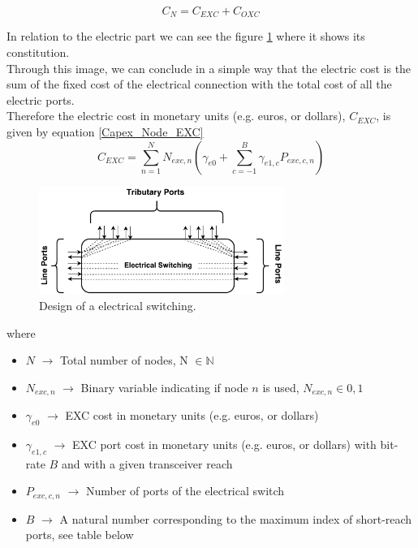 \begin{equation}
C_N = C_{EXC} + C_{OXC}
\label{Capex_Node}
\end{equation}

\vspace{11pt}
In relation to the electric part we can see the figure \ref{exc_design} where it shows its constitution.\\
Through this image, we can conclude in a simple way that the electric cost is the sum of the fixed cost of the electrical connection with the total cost of all the electric ports.\\
Therefore the electric cost in monetary units (e.g. euros, or dollars), $C_{EXC}$, is given by equation \ref{Capex_Node_EXC}\\

\begin{equation}
C_{EXC} = \sum_{n=1}^{N} N_{exc,n} \left( \gamma_{e0} + \sum_{c=-1}^B \gamma_{e1,c} P_{exc,c,n} \right)
\label{Capex_Node_EXC}
\end{equation}

\begin{figure}[h!]
\centering
\includegraphics[width=8cm]{sdf/ILP/figures/exc_design}
\caption{Design of a electrical switching.}
\label{exc_design}
\end{figure}

\noindent
where
\begin{itemize}
\item{$N$				$\rightarrow$	Total number of nodes, N $\in \mathbb{N}$}
\item{$N_{exc,n}$		$\rightarrow$	Binary variable indicating if node $n$ is used, $N_{exc,n} \in {0, 1}$}
\item{$\gamma_{e0}$ 	$\rightarrow$	EXC cost in monetary units (e.g. euros, or dollars)}
\item{$\gamma_{e1,c}$	$\rightarrow$	EXC port cost in monetary units (e.g. euros, or dollars) with bit-rate $B$ and with a given transceiver reach}
\item{$P_{exc,c,n}$	    $\rightarrow$	Number of ports of the electrical switch}
\item{$B$           	$\rightarrow$	A natural number corresponding to the maximum index of short-reach ports, see table below}
\end{itemize}

